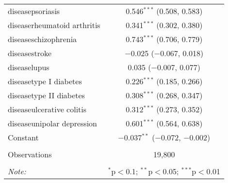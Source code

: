 \begin{table}[!htbp]
\begin{tabular}{@{\extracolsep{5pt}}lc}
  diseasepsoriasis & 0.546$^{***}$ (0.508, 0.583) \\ 
  diseaserheumatoid arthritis & 0.341$^{***}$ (0.302, 0.380) \\ 
  diseaseschizophrenia & 0.743$^{***}$ (0.706, 0.779) \\ 
  diseasestroke & $-$0.025 ($-$0.067, 0.018) \\ 
  diseaselupus & 0.035 ($-$0.007, 0.077) \\ 
  diseasetype I diabetes & 0.226$^{***}$ (0.185, 0.266) \\ 
  diseasetype II diabetes & 0.308$^{***}$ (0.268, 0.347) \\ 
  diseaseulcerative colitis & 0.312$^{***}$ (0.273, 0.352) \\ 
  diseaseunipolar depression & 0.601$^{***}$ (0.564, 0.638) \\ 
  Constant & $-$0.037$^{**}$ ($-$0.072, $-$0.002) \\ 
 \hline \\[-1.8ex] 
Observations & 19,800 \\ 
\hline 
\hline \\[-1.8ex] 
\textit{Note:}  & \multicolumn{1}{r}{$^{*}$p$<$0.1; $^{**}$p$<$0.05; $^{***}$p$<$0.01} \\ 
\end{tabular} 
\end{table} 
